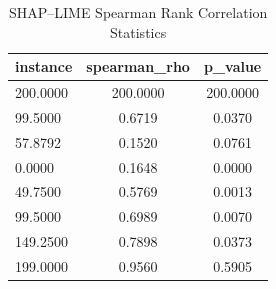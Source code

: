 \begin{table}
\centering
\caption{SHAP–LIME Spearman Rank Correlation Statistics}
\label{tab:agreement}
\begin{tabular}{lcc}
\toprule
instance & spearman_rho & p_value \\
\midrule
200.0000 & 200.0000 & 200.0000 \\
99.5000 & 0.6719 & 0.0370 \\
57.8792 & 0.1520 & 0.0761 \\
0.0000 & 0.1648 & 0.0000 \\
49.7500 & 0.5769 & 0.0013 \\
99.5000 & 0.6989 & 0.0070 \\
149.2500 & 0.7898 & 0.0373 \\
199.0000 & 0.9560 & 0.5905 \\
\bottomrule
\end{tabular}
\end{table}
